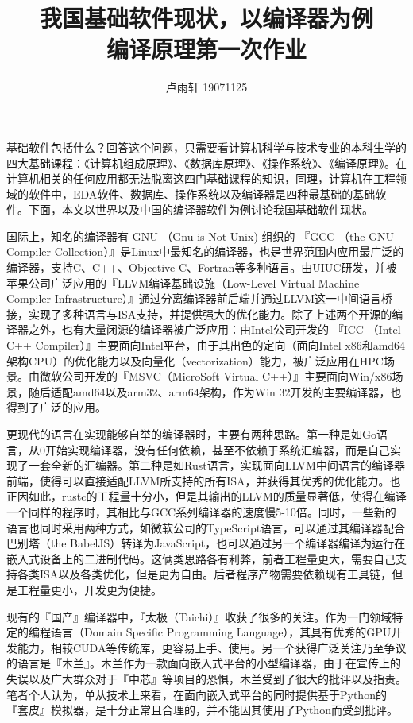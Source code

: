 \documentclass{ctexart}
\title{我国基础软件现状，以编译器为例 \\
\large 编译原理第一次作业}
\author{卢雨轩 19071125}
\begin{document}
\maketitle

基础软件包括什么？回答这个问题，只需要看计算机科学与技术专业的本科生学的四大基础课程：《计算机组成原理》、《数据库原理》、《操作系统》、《编译原理》。在计算机相关的任何应用都无法脱离这四门基础课程的知识，同理，计算机在工程领域的软件中，EDA软件、数据库、操作系统以及编译器是四种最基础的基础软件。下面，本文以世界以及中国的编译器软件为例讨论我国基础软件现状。

国际上，知名的编译器有 GNU （Gnu is Not Unix) 组织的 『GCC （the GNU Compiler Collection）』是Linux中最知名的编译器，也是世界范围内应用最广泛的编译器，支持C、C++、Objective-C、Fortran等多种语言。由UIUC研发，并被苹果公司广泛应用的『LLVM编译基础设施（Low-Level Virtual Machine Compiler Infrastructure）』通过分离编译器前后端并通过LLVM这一中间语言桥接，实现了多种语言与ISA支持，并提供强大的优化能力。除了上述两个开源的编译器之外，也有大量闭源的编译器被广泛应用：由Intel公司开发的 『ICC （Intel C++ Compiler）』主要面向Intel平台，由于其出色的定向（面向Intel x86和amd64架构CPU）的优化能力以及向量化（vectorization）能力，被广泛应用在HPC场景。由微软公司开发的『MSVC（MicroSoft Virtual C++）』主要面向Win/x86场景，随后适配amd64以及arm32、arm64架构，作为Win 32开发的主要编译器，也得到了广泛的应用。

更现代的语言在实现能够自举的编译器时，主要有两种思路。第一种是如Go语言，从0开始实现编译器，没有任何依赖，甚至不依赖于系统汇编器，而是自己实现了一套全新的汇编器。第二种是如Rust语言，实现面向LLVM中间语言的编译器前端，使得可以直接适配LLVM所支持的所有ISA，并获得其优秀的优化能力。也正因如此，rustc的工程量十分小，但是其输出的LLVM的质量显著低，使得在编译一个同样的程序时，其相比与GCC系列编译器的速度慢5-10倍\cite{WhydoesR60:online}。同时，一些新的语言也同时采用两种方式，如微软公司的TypeScript语言，可以通过其编译器配合巴别塔（the BabelJS）转译为JavaScript，也可以通过另一个编译器编译为运行在嵌入式设备上的二进制代码。这俩类思路各有利弊，前者工程量更大，需要自己支持各类ISA以及各类优化，但是更为自由。后者程序产物需要依赖现有工具链，但是工程量更小，开发更为便捷。

现有的『国产』编译器中，『太极（Taichi）』\cite{Hu_2020}收获了很多的关注。作为一门领域特定的编程语言（Domain Specific Programming Language），其具有优秀的GPU开发能力，相较CUDA等传统库，更容易上手、使用。另一个获得广泛关注乃至争议的语言是『木兰』。木兰作为一款面向嵌入式平台的小型编译器，由于在宣传上的失误以及广大群众对于『中芯』等项目的恐惧，木兰受到了很大的批评以及指责。笔者个人认为，单从技术上来看，在面向嵌入式平台的同时提供基于Python的『套皮』模拟器，是十分正常且合理的，并不能因其使用了Python而受到批评。
\end{document}
